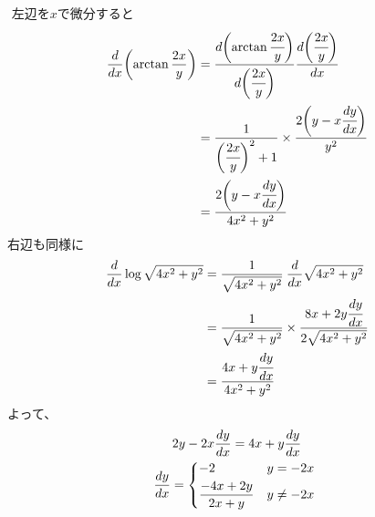 \begin{ans*}
  ${}$
  左辺を$x$で微分すると
  \begin{align}
    \frac{d}{dx}\biggl(\arctan\frac{2x}{y}\biggr)
    &= \frac{d\biggl(\arctan\cfrac{2x}{y}\biggr)}{d\biggl(\cfrac{2x}{y}\biggr)} \frac{d\biggl(\cfrac{2x}{y}\biggr)}{dx} \\
    &= \frac{1}{\biggl(\cfrac{2x}{y}\biggr)^2 + 1}
    \times \frac{2\biggl(y - x\cfrac{dy}{dx}\biggr)}{y^2} \\
    &= \frac{2\biggl(y-x\cfrac{dy}{dx}\biggr)}{4x^2+y^2}
  \end{align}
  右辺も同様に
  \begin{align}
    \frac{d}{dx}\log\sqrt{4x^2+y^2}
    &= \frac{1}{\sqrt{4x^2+y^2}}\:\frac{d}{dx}\sqrt{4x^2+y^2} \\
    &= \frac{1}{\sqrt{4x^2+y^2}}
    \times \frac{8x + 2y \cfrac{dy}{dx}}{2\sqrt{4x^2+y^2}} \\
    &= \frac{4x + y\cfrac{dy}{dx}}{4x^2+y^2}
  \end{align}
  よって、
  \begin{gather}
    2y - 2x\frac{dy}{dx} = 4x + y\frac{dy}{dx} \\
    \frac{dy}{dx} =
    \begin{dcases*}
      -2 & $y = -2x$ \\
      \frac{-4x+2y}{2x+y} & $y \neq -2x$ \\
    \end{dcases*}
  \end{gather}
\end{ans*}


